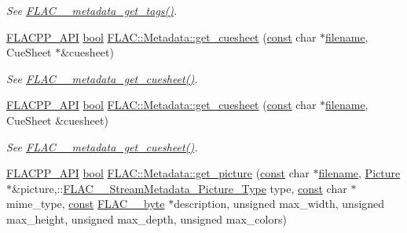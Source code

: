 \begin{DoxyCompactItemize}
\begin{DoxyCompactList}\small\item\em See \hyperlink{group__flac__metadata__level0_gaf66469f31dca28837ffd3f8b0ec5c082}{F\+L\+A\+C\+\_\+\+\_\+metadata\+\_\+get\+\_\+tags()}. \end{DoxyCompactList}\item 
\hyperlink{group__flacpp__export_gaec3a801bf18630403eda6dc2f8c4927a}{F\+L\+A\+C\+P\+P\+\_\+\+A\+PI} \hyperlink{mac_2config_2i386_2lib-src_2libsoxr_2soxr-config_8h_abb452686968e48b67397da5f97445f5b}{bool} \hyperlink{group__flacpp__metadata__level0_gae777a0aba6a7a3cb9e876f4823355279}{F\+L\+A\+C\+::\+Metadata\+::get\+\_\+cuesheet} (\hyperlink{getopt1_8c_a2c212835823e3c54a8ab6d95c652660e}{const} char $\ast$\hyperlink{test__portburn_8cpp_a7efa5e9c7494c7d4586359300221aa5d}{filename}, Cue\+Sheet $\ast$\&cuesheet)
\begin{DoxyCompactList}\small\item\em See \hyperlink{group__flac__metadata__level0_ga6ee2633dc179c2a0cb5fef5762faf0fd}{F\+L\+A\+C\+\_\+\+\_\+metadata\+\_\+get\+\_\+cuesheet()}. \end{DoxyCompactList}\item 
\hyperlink{group__flacpp__export_gaec3a801bf18630403eda6dc2f8c4927a}{F\+L\+A\+C\+P\+P\+\_\+\+A\+PI} \hyperlink{mac_2config_2i386_2lib-src_2libsoxr_2soxr-config_8h_abb452686968e48b67397da5f97445f5b}{bool} \hyperlink{group__flacpp__metadata__level0_ga4841af6cb6c5dc46d255d1d6e34d2c87}{F\+L\+A\+C\+::\+Metadata\+::get\+\_\+cuesheet} (\hyperlink{getopt1_8c_a2c212835823e3c54a8ab6d95c652660e}{const} char $\ast$\hyperlink{test__portburn_8cpp_a7efa5e9c7494c7d4586359300221aa5d}{filename}, Cue\+Sheet \&cuesheet)
\begin{DoxyCompactList}\small\item\em See \hyperlink{group__flac__metadata__level0_ga6ee2633dc179c2a0cb5fef5762faf0fd}{F\+L\+A\+C\+\_\+\+\_\+metadata\+\_\+get\+\_\+cuesheet()}. \end{DoxyCompactList}\item 
\hyperlink{group__flacpp__export_gaec3a801bf18630403eda6dc2f8c4927a}{F\+L\+A\+C\+P\+P\+\_\+\+A\+PI} \hyperlink{mac_2config_2i386_2lib-src_2libsoxr_2soxr-config_8h_abb452686968e48b67397da5f97445f5b}{bool} \hyperlink{group__flacpp__metadata__level0_gaf11a81a7152bbe0e31d8fd6f29df8334}{F\+L\+A\+C\+::\+Metadata\+::get\+\_\+picture} (\hyperlink{getopt1_8c_a2c212835823e3c54a8ab6d95c652660e}{const} char $\ast$\hyperlink{test__portburn_8cpp_a7efa5e9c7494c7d4586359300221aa5d}{filename}, \hyperlink{vda_8h_a63024b9f4f18a0420b1e71b49205d3ca}{Picture} $\ast$\&picture,\+::\hyperlink{group__flac__format_gaf6d3e836cee023e0b8d897f1fdc9825d}{F\+L\+A\+C\+\_\+\+\_\+\+Stream\+Metadata\+\_\+\+Picture\+\_\+\+Type} type, \hyperlink{getopt1_8c_a2c212835823e3c54a8ab6d95c652660e}{const} char $\ast$mime\+\_\+type, \hyperlink{getopt1_8c_a2c212835823e3c54a8ab6d95c652660e}{const} \hyperlink{ordinals_8h_a5eb569b12d5b047cdacada4d57924ee3}{F\+L\+A\+C\+\_\+\+\_\+byte} $\ast$description, unsigned max\+\_\+width, unsigned max\+\_\+height, unsigned max\+\_\+depth, unsigned max\+\_\+colors)

\end{DoxyCompactItemize}
